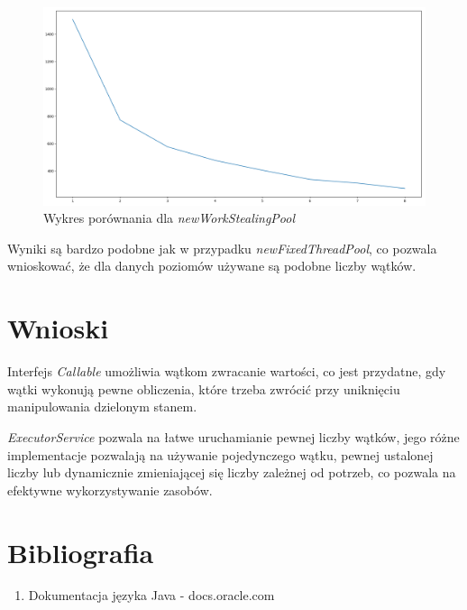 \documentclass{article}
\begin{document}
\begin{figure}[H]
    \centering
    \includegraphics[width=\textwidth]{figure_2.png}
    \caption{Wykres porównania dla \textit{newWorkStealingPool}}
\end{figure}

Wyniki są bardzo podobne jak w przypadku \textit{newFixedThreadPool}, co pozwala wnioskować, że dla danych poziomów
używane są podobne liczby wątków.

\section{Wnioski}

Interfejs \textit{Callable} umożliwia wątkom zwracanie wartości, co jest przydatne, gdy wątki wykonują pewne
obliczenia, które trzeba zwrócić przy uniknięciu manipulowania dzielonym stanem.

\textit{ExecutorService} pozwala na łatwe uruchamianie pewnej liczby wątków, jego różne implementacje pozwalają
na używanie pojedynczego wątku, pewnej ustalonej liczby lub dynamicznie zmieniającej się liczby zależnej od 
potrzeb, co pozwala na efektywne wykorzystywanie zasobów.

\section{Bibliografia}

\begin{enumerate}
    \item 
    Dokumentacja języka Java - docs.oracle.com
\end{enumerate}
\end{document}
